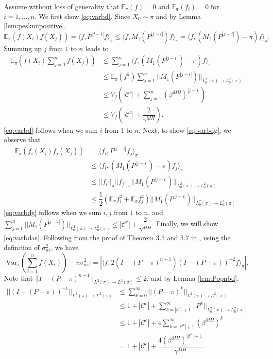 \documentclass[12pt,a4]{amsart}
\numberwithin{equation}{section}
\theoremstyle{plain}
\theoremstyle{definition}
\theoremstyle{remark}
\let\oldendproof\endproof
\renewenvironment{proof}[1][\proofname]{%
  \oldproof[\noindent\textbf{#1.} ]%
}{\oldendproof}
\newcommand{\1}{\mathds{1}}
\newcommand{\E}{\mathbb{E}}
\renewcommand{\leq}{\leqslant}
\begin{document}
\begin{proof}[Proof of Theorem \ref{thm:varbd}]
	Assume without loss of generality that $\E_{\pi}(f) = 0$ and $\E_{\pi}(f_i) = 0$ for $i=1,\ldots,n$. We first show \eqref{eq:varbd}. Since $X_0 \sim \pi$ and by Lemma \ref{lem:peskunpositive},
	$$\E_{\pi}(f(X_i)f(X_j)) = \langle f, P^{|j-i|} f \rangle_{\pi} \leq \langle f, M_1(P^{|j-i|}) f \rangle_{\pi} = \langle f, (M_1(P^{|j-i|}) - \pi) f \rangle_{\pi}.$$
	Summing up $j$ from $1$ to $n$ leads to
	\begin{align*}
		\E_{\pi}\left(f(X_i) \sum_{j=1}^n f(X_j) \right) &\leq \sum_{j=1}^n \langle f, (M_1(P^{|j-i|}) - \pi) f \rangle_{\pi} \\
		&\leq \E_{\pi}(f^2) \sum_{j=1}^n ||M_1(P^{|j-i|})||_{L^2_0(\pi) \to L^2_0(\pi)} \\
		&\leq V_f \left( |\mathcal{C}^c| + \sum_{j=1}^n (\beta^{MH})^{|j-i|} \right) \\
		&\leq V_f \left( |\mathcal{C}^c| +\dfrac{2}{\gamma^{MH}} \right).
	\end{align*}
	\eqref{eq:varbd} follows when we sum $i$ from $1$ to $n$. Next, to show \eqref{eq:varbdg}, we observe that
	\begin{align*}
		\E_{\pi}(f_i(X_i)f_j(X_j)) &= \langle f_i, P^{|j-i|} f_j \rangle_{\pi} \\
		&\leq \langle f_i, (M_1(P^{|j-i|}) - \pi) f_j \rangle_{\pi} \\
		&\leq ||f_i||_{\pi} ||f_j||_{\pi} ||M_1(P^{|j-i|})||_{L^2_0(\pi) \to L^2_0(\pi)} \\
		&\leq \dfrac{1}{2} (\E_{\pi}f_i^2 + \E_{\pi}f_j^2) ||M_1(P^{|j-i|})||_{L^2_0(\pi) \to L^2_0(\pi)}.
	\end{align*}
	\eqref{eq:varbdg} follows when we sum $i,j$ from $1$ to $n$, and $\sum_{j=1}^n ||M_1(P^{|j-i|})||_{L^2_0(\pi) \to L^2_0(\pi)} \leq |\mathcal{C}^c| +\dfrac{2}{\gamma^{MH}}$. Finally, we will show \eqref{eq:varbdas}. Following from the proof of Theorem $3.5$ and $3.7$ in \cite{Paulin15}, using the definition of $\sigma_{as}^2$, we have
	$$\bigg| \mathrm{Var}_{\pi} \left(\sum_{i=1}^n f(X_i) \right) - n \sigma_{as}^2 \bigg| = | \langle f, 2 (I - (P - \pi)^{n-1})(I - (P - \pi))^{-2}f \rangle_{\pi} | .$$
	Note that $||I - (P - \pi)^{n-1}||_{L^2(\pi) \to L^2(\pi)} \leq 2$, and by Lemma \ref{lem:Popnbd},
	\begin{align*}
		||(I - (P - \pi))^{-1}||_{L^2(\pi) \to L^2(\pi)} &\leq \sum_{k=0}^{\infty} ||(P - \pi)^{k}||_{L^2(\pi) \to L^2(\pi)} \\
		&\leq 1 + |\mathcal{C}^c| + \sum_{k=|\mathcal{C}^c| +1}^{\infty} ||P^{k}||_{L^2_0(\pi) \to L^2_0(\pi)} \\
		&\leq 1 + |\mathcal{C}^c| + 4 \sum_{k=|\mathcal{C}^c| +1}^{\infty} (\beta^{MH})^{k} \\
		&=  1 + |\mathcal{C}^c| + \dfrac{4 (\beta^{MH})^{|\mathcal{C}^c| +1}}{\gamma^{MH}}.
	\end{align*}
\end{proof}
\end{document}
